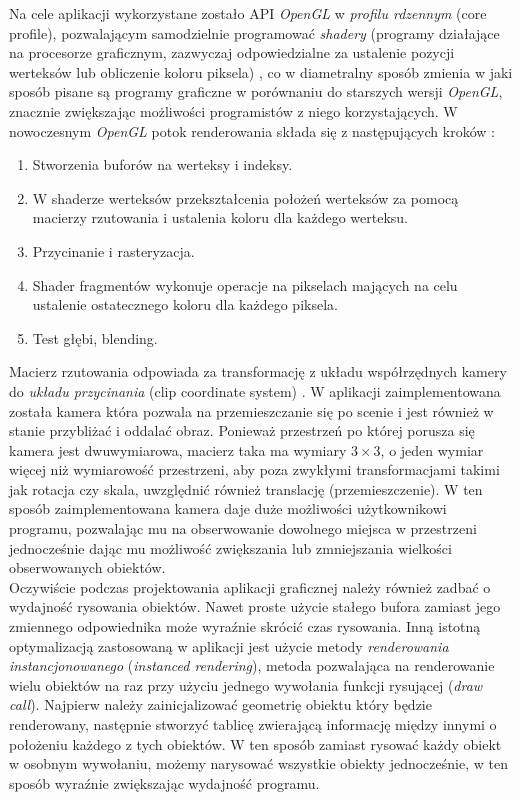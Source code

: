 \documentclass[12pt, letterpaper]{report}
\begin{document}
    Na cele aplikacji wykorzystane zostało API \emph{OpenGL} w \emph{profilu rdzennym} (core profile), 
    pozwalającym samodzielnie programować \emph{shadery} (programy działające na procesorze graficznym, 
    zazwyczaj odpowiedzialne za ustalenie pozycji werteksów lub obliczenie koloru piksela) \cite{grafika3d}, 
    co w diametralny sposób zmienia w jaki sposób pisane są programy graficzne w porównaniu 
    do starszych wersji \emph{OpenGL}, znacznie zwiększając możliwości programistów z niego 
    korzystających. W nowoczesnym \emph{OpenGL} potok renderowania składa 
    się z następujących kroków \cite{grafika3d}:
    \begin{enumerate}
        \item Stworzenia buforów na werteksy i indeksy.
        \item W shaderze werteksów przekształcenia położeń werteksów 
        za pomocą macierzy rzutowania i ustalenia koloru dla każdego werteksu.
        \item Przycinanie i rasteryzacja.
        \item Shader fragmentów wykonuje operacje na pikselach mających na celu 
        ustalenie ostatecznego koloru dla każdego piksela.
        \item Test głębi, blending.
    \end{enumerate}

    Macierz rzutowania odpowiada za transformację z układu współrzędnych kamery do \emph{układu przycinania}
    (clip coordinate system) \cite{grafika3d}. W aplikacji 
    zaimplementowana została kamera która pozwala na przemieszczanie się po scenie i jest również w stanie 
    przybliżać i oddalać obraz. 
    Ponieważ przestrzeń po której porusza się
    kamera jest dwuwymiarowa, macierz taka ma wymiary $3 \times 3$, o jeden wymiar więcej niż wymiarowość 
    przestrzeni, aby poza zwykłymi transformacjami takimi jak rotacja czy skala, uwzględnić również
    translację (przemieszczenie).
    W ten sposób zaimplementowana kamera daje duże możliwości użytkownikowi programu, pozwalając 
    mu na obserwowanie dowolnego miejsca w przestrzeni jednocześnie dając mu możliwość zwiększania
    lub zmniejszania wielkości obserwowanych obiektów. \\

    Oczywiście podczas projektowania aplikacji graficznej należy również zadbać o
    wydajność rysowania obiektów. Nawet proste użycie stałego bufora zamiast jego 
    zmiennego odpowiednika może wyraźnie skrócić czas rysowania.
    Inną istotną optymalizacją zastosowaną w aplikacji jest użycie 
    metody \emph{renderowania instancjonowanego} (\emph{instanced rendering}), 
    metoda pozwalająca na renderowanie wielu obiektów na raz 
    przy użyciu jednego wywołania funkcji rysującej (\emph{draw call}). 
    Najpierw należy zainicjalizować geometrię obiektu który będzie renderowany, 
    następnie stworzyć tablicę zwierającą informację 
    między innymi o położeniu każdego z tych obiektów. 
    W ten sposób zamiast rysować każdy obiekt w osobnym wywołaniu, 
    możemy narysować wszystkie obiekty jednocześnie, 
    w ten sposób wyraźnie zwiększając wydajność programu.
\end{document}
